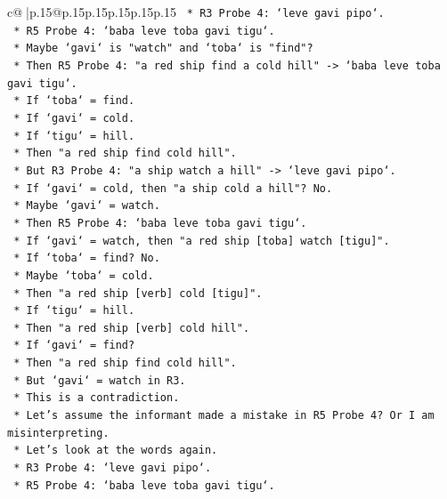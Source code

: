 \documentclass{article}
\begin{document}
{\begin{supertabular}{c@{$\;$}|p{.15\linewidth}@{}p{.15\linewidth}p{.15\linewidth}p{.15\linewidth}p{.15\linewidth}p{.15\linewidth}}
{{{\texttt{        *   R3 Probe 4: `leve gavi pipo`.} \\
\texttt{        *   R5 Probe 4: `baba leve toba gavi tigu`.} \\
\texttt{        *   Maybe `gavi` is "watch" and `toba` is "find"?} \\
\texttt{        *   Then R5 Probe 4: "a red ship find a cold hill" {-}> `baba leve toba gavi tigu`.} \\
\texttt{        *   If `toba` = find.} \\
\texttt{        *   If `gavi` = cold.} \\
\texttt{        *   If `tigu` = hill.} \\
\texttt{        *   Then "a red ship find cold hill".} \\
\texttt{        *   But R3 Probe 4: "a ship watch a hill" {-}> `leve gavi pipo`.} \\
\texttt{        *   If `gavi` = cold, then "a ship cold a hill"? No.} \\
\texttt{        *   Maybe `gavi` = watch.} \\
\texttt{        *   Then R5 Probe 4: `baba leve toba gavi tigu`.} \\
\texttt{        *   If `gavi` = watch, then "a red ship {[}toba{]} watch {[}tigu{]}".} \\
\texttt{        *   If `toba` = find? No.} \\
\texttt{        *   Maybe `toba` = cold.} \\
\texttt{        *   Then "a red ship {[}verb{]} cold {[}tigu{]}".} \\
\texttt{        *   If `tigu` = hill.} \\
\texttt{        *   Then "a red ship {[}verb{]} cold hill".} \\
\texttt{        *   If `gavi` = find?} \\
\texttt{        *   Then "a red ship find cold hill".} \\
\texttt{        *   But `gavi` = watch in R3.} \\
\texttt{        *   This is a contradiction.} \\
\texttt{        *   Let's assume the informant made a mistake in R5 Probe 4? Or I am misinterpreting.} \\
\texttt{        *   Let's look at the words again.} \\
\texttt{        *   R3 Probe 4: `leve gavi pipo`.} \\
\texttt{        *   R5 Probe 4: `baba leve toba gavi tigu`.} \\
}}}
\end{supertabular}}
\end{document}
